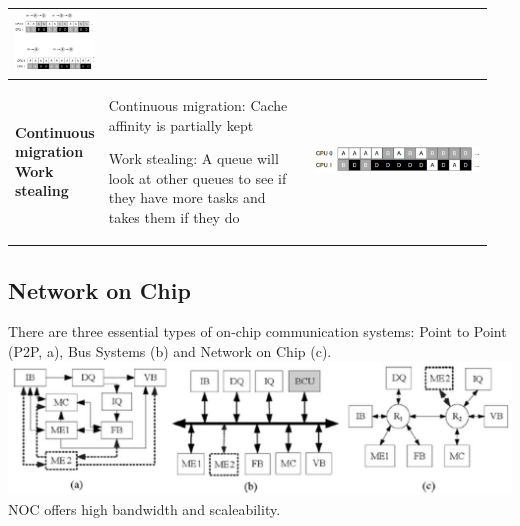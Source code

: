 \begin{longtable}{|>{\bfseries}p{0.1\linewidth}|p{0.45\linewidth}|p{0.4\linewidth}|}
			\includegraphics[width=\linewidth]{./pictures/mqms.png}\\
			\hline
			Continuous migration \newline\newline
			Work stealing
			&
			\begin{compactitem}
				\item Continuous migration: Cache affinity is partially kept
				\item Work stealing: A queue will look at other queues to see if they have more tasks and takes them if they do
			\end{compactitem}
			&
			\vspace{0pt}
			
			\includegraphics[width=\linewidth]{./pictures/mqms2.png}\\
			\hline
		\end{longtable}
	
	\subsection{Network on Chip}
		There are three essential types of on-chip communication systems: Point to Point (P2P, a), Bus Systems (b) and Network on Chip (c). \\
		\includegraphics[width=\linewidth]{./pictures/network.png}\\
		NOC offers high bandwidth and scaleability.